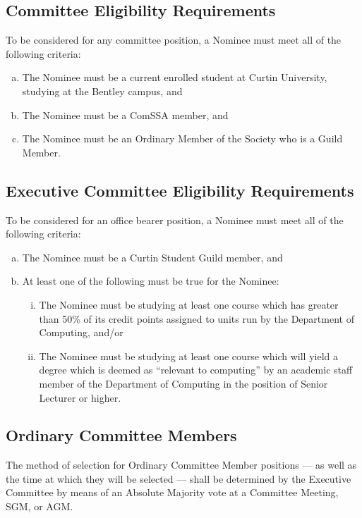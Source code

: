 \documentclass[a4paper,12pt]{article}
\begin{document}
\subsection{Committee Eligibility Requirements}
\label{committee_eligibility}

To be considered for any committee position, a Nominee must meet all of the following criteria:

\begin{enumerate}[a)]
	\item The Nominee must be a current enrolled student at Curtin University, studying at the Bentley campus, and
	\item The Nominee must be a ComSSA member, and
	\item The Nominee must be an Ordinary Member of the Society who is a Guild Member.
\end{enumerate}

\subsection{Executive Committee Eligibility Requirements}
\label{exec_committee_eligibility}

To be considered for an office bearer position, a Nominee must meet all of the following criteria:

\begin{enumerate}[a)]
	\item The Nominee must be a Curtin Student Guild member, and
	\item At least one of the following must be true for the Nominee:
	\begin{enumerate}[i)]
		\item The Nominee must be studying at least one course which has greater than 50\% of its credit points assigned to units run by the Department of Computing, and/or
		\item The Nominee must be studying at least one course which will yield a degree which is deemed as ``relevant to computing'' by an academic staff member of the Department of Computing in the position of Senior Lecturer or higher.
	\end{enumerate}
\end{enumerate}

\subsection{Ordinary Committee Members}

The method of selection for Ordinary Committee Member positions --- as well as the time at which they will be selected --- shall be determined by the Executive Committee by means of an Absolute Majority vote at a Committee Meeting, SGM, or AGM.
\end{document}
